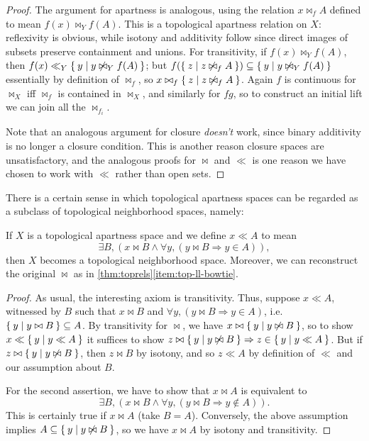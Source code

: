 \documentclass{article}
\let\implies\Rightarrow
\begin{document}
\begin{proof}
  The argument for apartness is analogous, using the relation $x\bowtie_f A$ defined to mean $f(x)\bowtie_Y f(A)$.
  This is a topological apartness relation on $X$: reflexivity is obvious, while isotony and additivity follow since direct images of subsets preserve containment and unions.
  For transitivity, if $f(x)\bowtie_Y f(A)$, then $f(x) \ll_Y \Set{y|y\not\bowtie_Y f(A)}$; but $f(\Set{z|z\not\bowtie_f A}) \subseteq \Set{y|y\not\bowtie_Y f(A)}$ essentially by definition of $\bowtie_f$, so $x\bowtie_f \Set{z|z\not\bowtie_f A}$.
  Again $f$ is continuous for $\bowtie_X$ iff $\bowtie_f$ is contained in $\bowtie_X$, and similarly for $f g$, so to construct an initial lift we can join all the $\bowtie_{f_i}$.

  Note that an analogous argument for closure \emph{doesn't} work, since binary additivity is no longer a closure condition.
  This is another reason closure spaces are unsatisfactory, and the analogous proofs for $\bowtie$ and $\ll$ is one reason we have chosen to work with $\ll$ rather than open sets.
\end{proof}

There is a certain sense in which topological apartness spaces can be regarded as a subclass of topological neighborhood spaces, namely:

\begin{lem}\label{thm:top-bowtie-ll}
  If $X$ is a topological apartness space and we define $x\ll A$ to mean
  \begin{equation}
    \exists B, (x\bowtie B \land \forall y, (y\bowtie B \implies y\in A)),\label{eq:top-bowtie-ll-1}
  \end{equation}
  then $X$ becomes a topological neighborhood space.
  Moreover, we can reconstruct the original $\bowtie$ as in \cref{thm:toprels}\ref{item:top-ll-bowtie}.
\end{lem}
\begin{proof}
  As usual, the interesting axiom is transitivity.
  Thus, suppose $x\ll A$, witnessed by $B$ such that $x\bowtie B$ and $\forall y,(y\bowtie B \implies y\in A)$, i.e.\ $\Set{y|y\bowtie B} \subseteq A$.
  By transitivity for $\bowtie$, we have $x\bowtie \Set{y|y\not\bowtie B}$, so to show $x\ll \Set{y|y\ll A}$ it suffices to show $z\bowtie \setof{y|y\not\bowtie B} \implies z\in \setof{y|y\ll A}$.
  But if $z\bowtie \Set{y|y\not\bowtie B}$, then $z\bowtie B$ by isotony, and so $z\ll A$ by definition of $\ll$ and our assumption about $B$.
  
  For the second assertion, we have to show that $x\bowtie A$ is equivalent to
  \[\exists B, (x\bowtie B \land \forall y, (y\bowtie B \implies y\notin A)).\]
  This is certainly true if $x\bowtie A$ (take $B=A$).
  Conversely, the above assumption implies $A \subseteq \Set{y|y\not\bowtie B}$, so we have $x\bowtie A$ by isotony and transitivity.
\end{proof}
\end{document}

